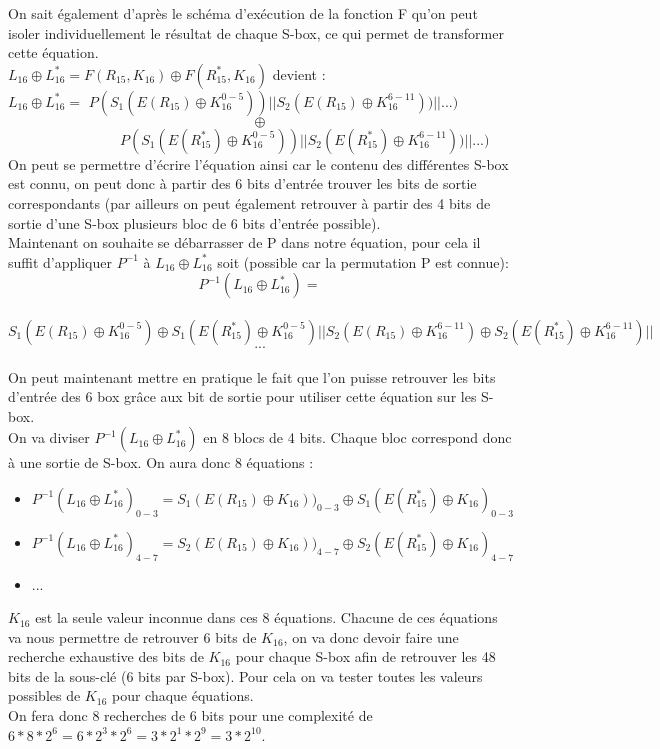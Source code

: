 \documentclass[a4paper,11pt]{article}
\begin{document}
	On sait également d'après le schéma d'exécution de la fonction F qu'on peut isoler individuellement le résultat de chaque S-box, ce qui permet de  transformer cette équation.\\
	$L_{16}  \oplus L_{16}^{*} = F(R_{15}, K_{16}) \oplus F(R_{15}^{*}, K_{16})$  devient :\\
	$L_{16} \oplus L_{16}^{*} = $
	$P(S_{1}(E(R_{15}) \oplus K_{16}^{0-5})) || S_{2}(E(R_{15}) \oplus K_{16}^{6-11}))||...)$\\
	$$\oplus$$
	\ \ \ \ \ \ \ \ \ \ \ \ \ \ \ \ $P(S_{1}(E(R_{15}^{*}) \oplus K_{16}^{0-5}))||S_{2}(E(R_{15}^{*}) \oplus K_{16}^{6-11}))||...)$\\
	On peut se permettre d'écrire l'équation ainsi car le contenu des différentes S-box est connu, on peut donc à partir des 6 bits d'entrée trouver les bits de sortie correspondants (par ailleurs on peut également retrouver à partir des 4 bits de sortie d'une S-box plusieurs bloc de 6 bits d'entrée possible).\\
	
	Maintenant on souhaite se débarrasser de P dans notre équation, pour cela il suffit d'appliquer $P^{-1}$ à 	$L_{16}  \oplus L_{16}^{*}$ soit (possible car la permutation P est connue): \\
	$$P^{-1} (L_{16}  \oplus L_{16}^{*}) = $$\\
	$$S_{1}(E(R_{15}) \oplus K_{16}^{0-5}) \oplus S_{1}(E(R_{15}^{*}) \oplus K_{16}^{0-5})
	 || 
	S_{2}(E(R_{15})\oplus K_{16}^{6-11}) \oplus S_{2}(E(R_{15}^{*}) \oplus K_{16}^{6-11})||$$
	$$...$$\\
	
	On peut maintenant mettre en pratique le fait que l'on puisse retrouver les bits d'entrée des 6 box grâce aux bit de sortie pour utiliser cette équation sur les S-box.\\
	On va diviser $P^{-1} (L_{16}  \oplus L_{16}^{*})$ en 8 blocs de 4 bits. Chaque bloc correspond donc à une sortie de S-box. 
	On aura donc 8 équations :\\
	\begin{itemize}
		\item $P^{-1} (L_{16}  \oplus L_{16}^{*})_{0-3} = S_{1}(E(R_{15}) \oplus K_{16}))_{0-3} \oplus S_{1}(E(R_{15}^{*}) \oplus K_{16})_{0-3} $
		\item $P^{-1} (L_{16}  \oplus L_{16}^{*})_{4-7} = S_{2}(E(R_{15}) \oplus K_{16}))_{4-7} \oplus S_{2}(E(R_{15}^{*}) \oplus K_{16})_{4-7} $
		\item ...
	\end{itemize}
	$K_{16}$ est la seule valeur inconnue dans ces 8 équations. Chacune de ces équations va nous permettre de retrouver 6 bits de $K_{16}$, on va donc devoir faire une recherche exhaustive des bits de $K_{16}$ pour chaque S-box afin de retrouver les 48 bits de la sous-clé (6 bits par S-box). Pour cela on va tester toutes les valeurs possibles de $K_{16}$ pour chaque équations.\\
	On fera donc 8 recherches de 6 bits pour une complexité de $6 * 8 * 2^{6} = 6 * 2^{3} * 2^{6} = 3 * 2^{1} * 2^{9} = 3 * 2^{10} $.
	
\end{document}
